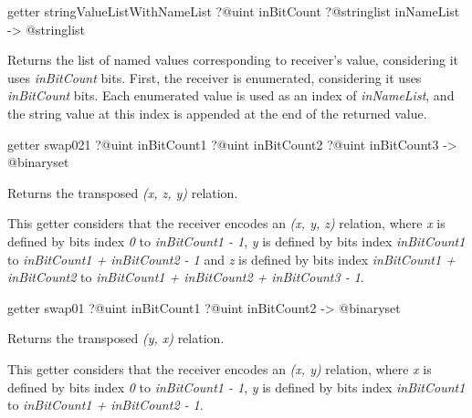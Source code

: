 \begin{galgas3box}
getter stringValueListWithNameList
  ?@uint inBitCount
  ?@stringlist inNameList
  -> @stringlist
\end{galgas3box}


Returns the list of named values corresponding to receiver's value, considering it uses \emph{inBitCount} bits. First, the receiver is enumerated, considering it uses \emph{inBitCount} bits. Each enumerated value is used as an index of \emph{inNameList}, and the string value at this index is appended at the end of the returned value.








\begin{galgas3box}
getter swap021
  ?@uint inBitCount1
  ?@uint inBitCount2
  ?@uint inBitCount3
  -> @binaryset
\end{galgas3box}



Returns the transposed \emph{(x, z, y)} relation.

This getter considers that the receiver encodes an \emph{(x, y, z)} relation, where \emph{x} is defined by bits index \emph{0} to \emph{inBitCount1  - 1}, \emph{y} is defined by bits index \emph{inBitCount1} to \emph{inBitCount1 + inBitCount2 - 1} and  \emph{z} is defined by bits index \emph{inBitCount1 + inBitCount2} to \emph{inBitCount1 + inBitCount2 + inBitCount3 - 1}.








\begin{galgas3box}
getter swap01 ?@uint inBitCount1 ?@uint inBitCount2 -> @binaryset
\end{galgas3box}


Returns the transposed \emph{(y, x)} relation.

This getter considers that the receiver encodes an \emph{(x, y)} relation, where \emph{x} is defined by bits index \emph{0} to \emph{inBitCount1  - 1}, \emph{y} is defined by bits index \emph{inBitCount1} to \emph{inBitCount1 + inBitCount2 - 1}.






